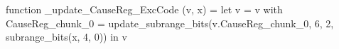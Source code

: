 function _update_CauseReg_ExcCode (v, x) = let v = { v with CauseReg_chunk_0 = update_subrange_bits(v.CauseReg_chunk_0, 6, 2, subrange_bits(x, 4, 0)) } in
  v
